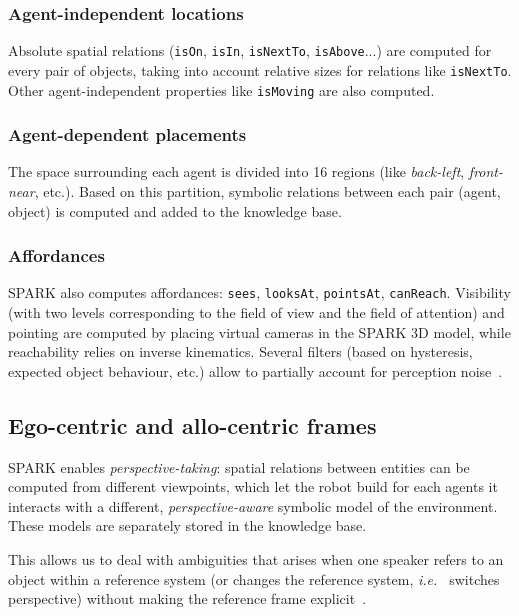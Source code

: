 \documentclass[letterpaper, 10 pt, conference]{ieeeconf}  %
\newcommand{\concept}[1]{{\small \texttt{#1}}}
\newcommand{\ie}{{\textit{i.e.\ }}}
\begin{document}
\subsubsection{Agent-independent locations}

Absolute spatial relations (\concept{isOn}, \concept{isIn}, \concept{isNextTo},
\concept{isAbove}...) are computed for every pair of objects, taking into
account relative sizes for relations like \concept{isNextTo}. Other
agent-independent properties like \concept{isMoving} are also computed.

\subsubsection{Agent-dependent placements}

The space surrounding each agent is divided into 16 regions (like
\emph{back-left}, \emph{front-near}, etc.). Based on this partition, symbolic
relations between each pair (agent, object) is computed and added to the
knowledge base.

\subsubsection{Affordances}

SPARK also computes affordances: \concept{sees}, \concept{looksAt},
\concept{pointsAt}, \concept{canReach}. Visibility (with two levels
corresponding to the field of view and the field of attention) and pointing are
computed by placing virtual cameras in the SPARK 3D model, while reachability
relies on inverse kinematics. Several filters (based on hysteresis, expected
object behaviour, etc.) allow to partially account for perception
noise~\cite{Warnier2012a}.

\subsection{Ego-centric and allo-centric frames}

SPARK enables \emph{perspective-taking}: spatial relations between entities can
be computed from different viewpoints, which let the robot build for each
agents it interacts with a different, \emph{perspective-aware} symbolic model
of the environment. These models are separately stored in the knowledge base.

This allows us to deal with ambiguities that arises when one speaker refers to
an object within a reference system (or changes the reference system, \ie
switches perspective) without making the reference frame
explicit~\cite{Breazeal2006, Ros2010}.
\end{document}
